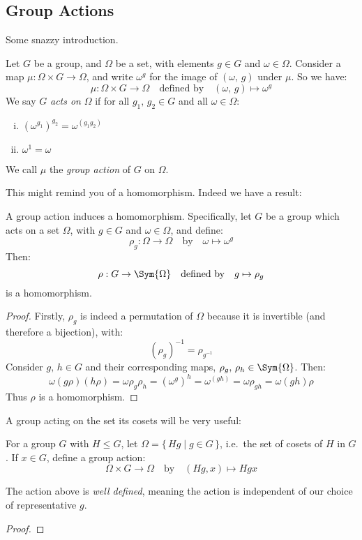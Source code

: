 \subsection{Group Actions}
Some snazzy introduction.

\begin{definition}
    Let \(G\) be a group, and \(\Omega\) be a set, with elements \(g \in G\) and \(\omega \in \Omega\).
    Consider a map \(\mu:\Omega \times G \to \Omega\), and write \(\omega^g\) for the image of \((\omega,\,g)\) under
    \(\mu\).
    So we have:
    \[\mu:\Omega \times G \to \Omega \quad \text{defined by} \quad (\omega,\,g) \mapsto \omega^g\]
    We say \(G\) \emph{acts on} \(\Omega\) if for all \(g_1,\,g_2 \in G\) and all \(\omega \in \Omega\):
    \begin{enumerate}[(i)]
        \item \({(\omega^{g_1})}^{g_2} = \omega^{(g_1 g_2)}\)
        \item \(\omega^1 = \omega\)
    \end{enumerate}
    We call \(\mu\) the \emph{group action} of \(G\) on \(\Omega\).
\end{definition}

This might remind you of a homomorphism.
Indeed we have a result:

\begin{lemma}\label{lem:actionhom}
    A group action induces a homomorphism.
    Specifically, let \(G\) be a group which acts on a set \(\Omega\), with \(g \in G\) and \(\omega \in \Omega\), and
    define:
    \[\rho_g:\Omega \to \Omega \quad \text{by} \quad \omega \mapsto \omega^g\]
    Then:
    \[\rho:G \to \Sym{\Omega} \quad \text{defined by} \quad g \mapsto \rho_g\]
    is a homomorphism.
\end{lemma}

\begin{proof}
    Firstly, \(\rho_g\) is indeed a permutation of \(\Omega\) because it is invertible (and therefore a bijection),
    with:
    \[{(\rho_g)}^{-1} = \rho_{g^{-1}}\]
    Consider \(g,\,h \in G\) and their corresponding maps, \(\rho_{g},\,\rho_{h} \in \Sym{\Omega}\).
    Then:
    \[\omega(g\rho)(h\rho) = \omega\rho_g\rho_h = {(\omega^g)}^h = \omega^{(gh)} = \omega\rho_{gh} = \omega(gh)\rho\]
    Thus \(\rho\) is a homomorphism.
\end{proof}

A group acting on the set its cosets will be very useful:

\begin{definition}
    For a group \(G\) with \(H \leqslant G\), let \(\Omega = \{\,Hg \mid g \in G\,\}\), i.e.\ the set of cosets of \(H\)
    in \(G\).
    If \(x \in G\), define a group action:
    \[\Omega \times G \to \Omega \quad \text{by} \quad (Hg, x) \mapsto Hgx\]
\end{definition}

\begin{lemma}
    The action above is \emph{well defined}, meaning the action is independent of our choice of representative \(g\).
\end{lemma}

\begin{proof}
\end{proof}




